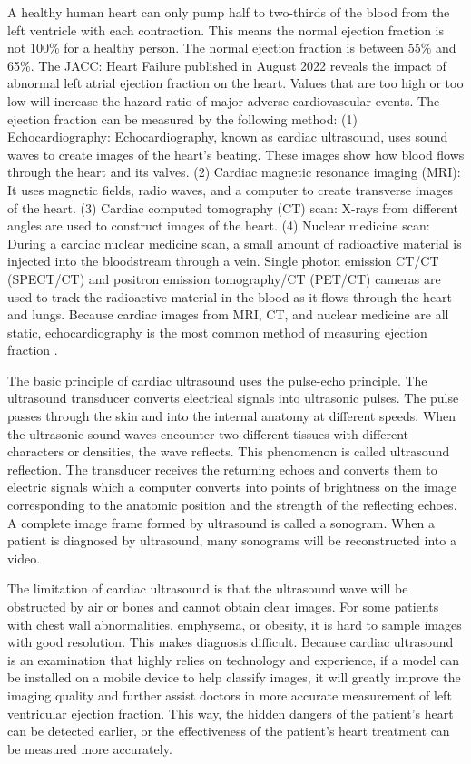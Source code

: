 \documentclass{article}
\begin{document}
A healthy human heart can only pump half to two-thirds of the blood from the left ventricle with each contraction. This means the normal ejection fraction is not 100\% for a healthy person. The normal ejection fraction is between 55\% and 65\%. The JACC: Heart Failure published in August 2022 reveals the impact of abnormal left atrial ejection fraction on the heart. Values that are too high or too low will increase the hazard ratio of major adverse cardiovascular events. 
The ejection fraction can be measured by the following method: (1) Echocardiography: Echocardiography, known as cardiac ultrasound, uses sound waves to create images of the heart's beating. These images show how blood flows through the heart and its valves. (2) Cardiac magnetic resonance imaging (MRI): It uses magnetic fields, radio waves, and a computer to create transverse images of the heart. (3) Cardiac computed tomography (CT) scan: X-rays from different angles are used to construct images of the heart. (4) Nuclear medicine scan: During a cardiac nuclear medicine scan, a small amount of radioactive material is injected into the bloodstream through a vein. Single photon emission CT/CT (SPECT/CT) and positron emission tomography/CT (PET/CT) cameras are used to track the radioactive material in the blood as it flows through the heart and lungs. Because cardiac images from MRI, CT, and nuclear medicine are all static, echocardiography is the most common method of measuring ejection fraction \cite{shah2022supranormal}. 


The basic principle of cardiac ultrasound uses the pulse-echo principle. The ultrasound transducer converts electrical signals into ultrasonic pulses. The pulse passes through the skin and into the internal anatomy at different speeds. When the ultrasonic sound waves encounter two different tissues with different characters or densities, the wave reflects. This phenomenon is called ultrasound reflection. The transducer receives the returning echoes and converts them to electric signals which a computer converts into points of brightness on the image corresponding to the anatomic position and the strength of the reflecting echoes. A complete image frame formed by ultrasound is called a sonogram. When a patient is diagnosed by ultrasound, many sonograms will be reconstructed into a video. 


The limitation of cardiac ultrasound is that the ultrasound wave will be obstructed by air or bones and cannot obtain clear images. For some patients with chest wall abnormalities, emphysema, or obesity, it is hard to sample images with good resolution. This makes diagnosis difficult. Because cardiac ultrasound is an examination that highly relies on technology and experience, if a model can be installed on a mobile device to help classify images, it will greatly improve the imaging quality and further assist doctors in more accurate measurement of left ventricular ejection fraction. This way, the hidden dangers of the patient’s heart can be detected earlier, or the effectiveness of the patient’s heart treatment can be measured more accurately. 
\end{document}
